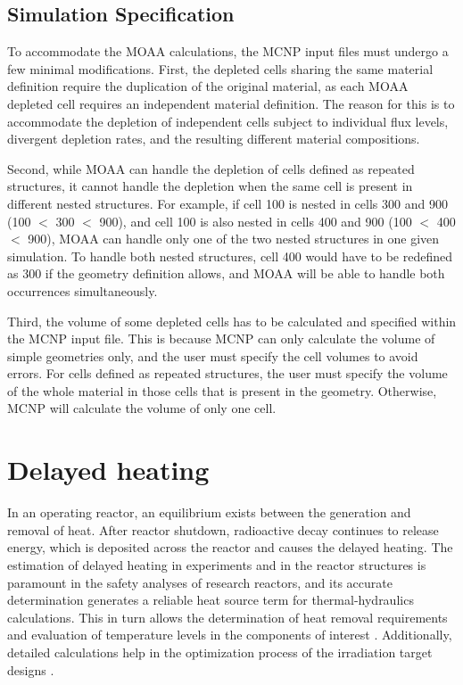 \subsection{Simulation Specification}

To accommodate the MOAA calculations, the MCNP input files must undergo a few minimal modifications.
First, the depleted cells sharing the same material definition require the duplication of the original material, as each MOAA depleted cell requires an independent material definition.
The reason for this is to accommodate the depletion of independent cells subject to individual flux levels, divergent depletion rates, and the resulting different material compositions.

Second, while MOAA can handle the depletion of cells defined as repeated structures, it cannot handle the depletion when the same cell is present in different nested structures.
For example, if cell 100 is nested in cells 300 and 900 (100 $<$ 300 $<$ 900), and cell 100 is also nested in cells 400 and 900 (100 $<$ 400 $<$ 900), MOAA can handle only one of the two nested structures in one given simulation.
To handle both nested structures, cell 400 would have to be redefined as 300 if the geometry definition allows, and MOAA will be able to handle both occurrences simultaneously.

Third, the volume of some depleted cells has to be calculated and specified within the MCNP input file.
This is because MCNP can only calculate the volume of simple geometries only, and the user must specify the cell volumes to avoid errors.
For cells defined as repeated structures, the user must specify the volume of the whole material in those cells that is present in the geometry.
Otherwise, MCNP will calculate the volume of only one cell.


\section{Delayed heating}

In an operating reactor, an equilibrium exists between the generation and removal of heat.
After reactor shutdown, radioactive decay continues to release energy, which is deposited across the reactor and causes the delayed heating.
The estimation of delayed heating in experiments and in the reactor structures is paramount in the safety analyses of research reactors, and its accurate determination generates a reliable heat source term for thermal-hydraulics calculations.
This in turn allows the determination of heat removal requirements and evaluation of temperature levels in the components of interest \cite{fairhurst_decay_2022, fairhurst_machine_2022, fairhurst_machine_2_2022}.
Additionally, detailed calculations help in the optimization process of the irradiation target designs \cite{peterson-droogh_current_2018}.

